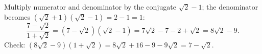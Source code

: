 Multiply numerator and denominator by the conjugate $\sqrt2-1$; the denominator becomes $(\sqrt2+1)(\sqrt2-1)=2-1=1$:
\[
\dfrac{7-\sqrt2}{1+\sqrt2}=(7-\sqrt2)(\sqrt2-1)=7\sqrt2-7-2+\sqrt2=\boxed{8\sqrt2-9}.
\]
Check: $(8\sqrt2-9)(1+\sqrt2)=8\sqrt2+16-9-9\sqrt2=7-\sqrt2$.
